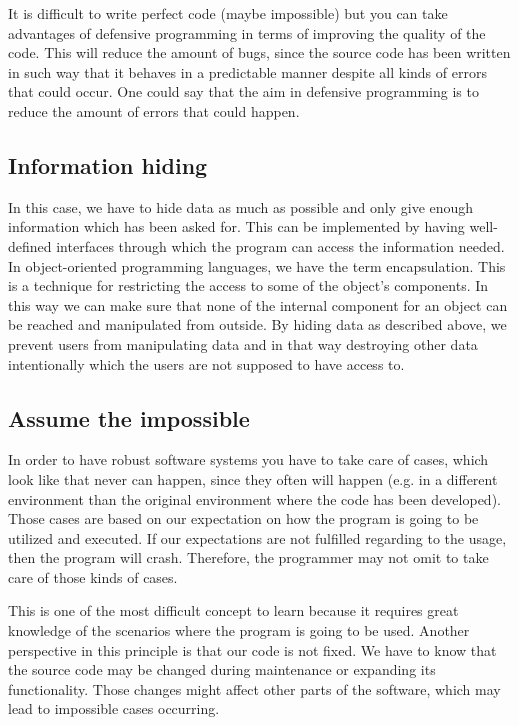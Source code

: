 \documentclass[10pt,a4paper]{article}
\begin{document}
It is difficult to write perfect code (maybe impossible) but you can take advantages of defensive programming in terms of improving the quality of the code. This will reduce the amount of bugs, since the source code has been written in such way that it behaves in a predictable manner despite all kinds of errors that could occur.
One could say that the aim in defensive programming is to reduce the amount of errors that could happen.

\subsection{Information hiding}

In this case, we have to hide data as much as possible and only give enough information which has been asked for.
This can be implemented by having well-defined interfaces through which the program can access the information needed.
In object-oriented programming languages, we have the term encapsulation. This is a technique for restricting the access to some of the object’s components. In this way we can make sure that none of the internal component for an object can be reached and manipulated from outside.
By hiding data as described above, we prevent users from manipulating data and in that way destroying other data intentionally which the users are not supposed to have access to.

\subsection{Assume the impossible}

In order to have robust software systems you have to take care of cases, which look like that never can happen, since they often will happen (e.g. in a different environment than the original environment where the code has been developed). Those cases are based on our expectation on how the program is going to be utilized and executed. If our expectations are not fulfilled regarding to the usage, then the program will crash. Therefore, the programmer may not omit to take care of those kinds of cases.
 
This is one of the most difficult concept to learn because it requires great knowledge of the scenarios where the program is going to be used.
Another perspective in this principle is that our code is not fixed. We have to know that the source code may be changed during maintenance or expanding its functionality. Those changes might affect other parts of the software, which may lead to impossible cases occurring. 
\end{document}
